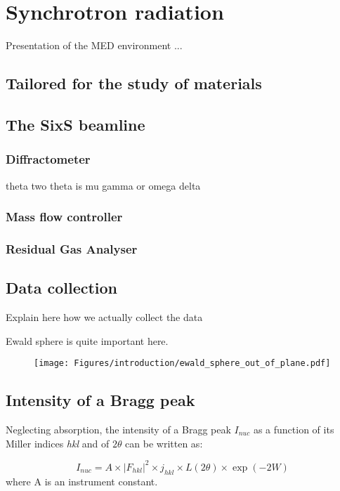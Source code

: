 \section{Synchrotron radiation}

Presentation of the MED environment ... 

\subsection{Tailored for the study of materials}

\subsection{The SixS beamline}

\subsubsection{Diffractometer}
theta two theta is mu gamma or omega delta

\subsubsection{Mass flow controller}

\subsubsection{Residual Gas Analyser}


\subsection{Data collection}

Explain here how we actually collect the data

Ewald sphere is quite important here.

\begin{figure}[!htb]
    \centering
    \texttt{[image: Figures/introduction/ewald\_sphere\_out\_of\_plane.pdf]}
    \caption{}
    \label{fig:EwaldSphere}
\end{figure}

\subsection{Intensity of a Bragg peak}
Neglecting absorption, the intensity of a Bragg peak $I_{nuc}$ as a function of its Miller indices \textit{hkl} and of $2\theta$ can be written as:

\begin{equation}
    \label{eq:PeakIntensity}
    I_{nuc} = A \times |F_{hkl}|^2  \times j_{hkl} \times L(2\theta) \times \exp{(-2W)}
\end{equation}
where A is an instrument constant.

